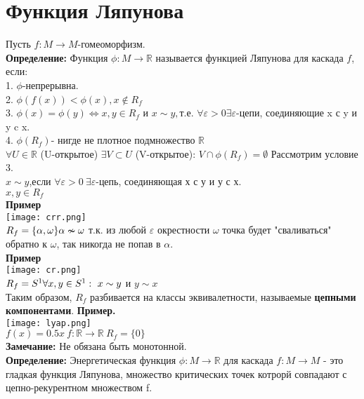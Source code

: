\documentclass[12pt,a4paper]{article}
\begin{document}
\section*{Функция Ляпунова}
 Пусть \(f:M \to M\)-гомеоморфизм.\\
\textbf{Определение: }Функция \(\phi:M \to \mathbb{R}\) называется функцией Ляпунова для каскада \(f\), если:\\
1. \(\phi\)-непрерывна.\\
2. \(\phi(f(x))<\phi(x), x \notin R_f\)\\
3. \(\phi(x)=\phi(y) \Leftrightarrow x,y \in R_f\) и \(x\sim y,\)т.е. \(\forall \varepsilon >0 \exists \varepsilon\)-цепи, соединяющие x с y и y c x.\\
4. \(\phi(R_f)\)- нигде не плотное подмножество \(\mathbb{R}\)\\
\(\forall U\in \mathbb{R}\) (U-открытое) \(\exists V \subset U\) (V-открытое): \(V\cap \phi(R_f)=\emptyset\)
Рассмотрим условие 3.\\
\(x \sim y\),если \(\forall \varepsilon >0 \ \exists \varepsilon\)-цепь, соединяющая х с у и у с х.\\
\(x,y \in R_f\) \\
\textbf{Пример}\\
\texttt{[image: crr.png]}\\
\(R_f = \{\alpha, \omega\} \\ \alpha \nsim \omega\) т.к. из любой \(\varepsilon\) окрестности \(\omega\) точка будет "сваливаться" обратно к \(\omega\), так никогда не попав в \(\alpha\).\\
\textbf{Пример}\\
\texttt{[image: cr.png]}\\
\(R_f = S^1 \\ \forall x,y \in S^1: \ x\sim y\) и \(y\sim x\) \\
Таким образом, \(R_f\) разбивается на классы эквивалетности, называемые \textbf{цепными компонентами}.
\newpage
\textbf{Пример.}\\
\texttt{[image: lyap.png]}\\
\(f(x)=0.5x \ f:\mathbb{R}\to \mathbb{R} \ R_f=\{0\}\)\\
\textbf{Замечание:} Не обязана быть монотонной.\\
\textbf{Определение: }Энергетическая функция \(\phi: M \to \mathbb{R}\) для каскада \(f:M \to M\) - это гладкая функция Ляпунова, множество критических точек котрорй совпадают с цепно-рекурентном множеством f. \\
\end{document}
